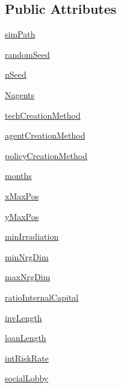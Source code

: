 \subsection*{Public Attributes}
\begin{DoxyCompactItemize}
\item 
\hyperlink{classenv_1_1environment_a5bdfe91b21e33187fc19732cb8a9b921}{sim\-Path}
\item 
\hyperlink{classenv_1_1environment_ae830fd3888199089f82966776e1f18c7}{random\-Seed}
\item 
\hyperlink{classenv_1_1environment_a4244ff6e2c8634df2516925372fd20b6}{n\-Seed}
\item 
\hyperlink{classenv_1_1environment_a59e53e7dea2fe8887ad57fc2d8401033}{Nagents}
\item 
\hyperlink{classenv_1_1environment_ad660202a7e9115467ba33e07b7a77410}{tech\-Creation\-Method}
\item 
\hyperlink{classenv_1_1environment_a9d3ca9f6128413b86d2dc36bdfeea2ff}{agent\-Creation\-Method}
\item 
\hyperlink{classenv_1_1environment_acd70b2f274af169cde96469312c2d15b}{policy\-Creation\-Method}
\item 
\hyperlink{classenv_1_1environment_ad476a5e1f3086610165842973d52e602}{months}
\item 
\hyperlink{classenv_1_1environment_a030668a5d974b79164862799ccddbff3}{x\-Max\-Pos}
\item 
\hyperlink{classenv_1_1environment_a1036c17b8afe9d1d7650bc781c9b7416}{y\-Max\-Pos}
\item 
\hyperlink{classenv_1_1environment_ad656812e1f4c4b1d904874b1852aa71d}{min\-Irradiation}
\item 
\hyperlink{classenv_1_1environment_ae6c208cb07e43fee86602e8c33cee097}{min\-Nrg\-Dim}
\item 
\hyperlink{classenv_1_1environment_ac66338a9395ca8bcf6b6258f26389f5d}{max\-Nrg\-Dim}
\item 
\hyperlink{classenv_1_1environment_a66246d7554c43ff1018b4cb033b6458d}{ratio\-Internal\-Capital}
\item 
\hyperlink{classenv_1_1environment_ad427d908e34d19a2b5b9a5f838df075c}{inv\-Length}
\item 
\hyperlink{classenv_1_1environment_a3c92d7cbf3a039cc851974f212250dd8}{loan\-Length}
\item 
\hyperlink{classenv_1_1environment_aa3b219d914da6b0d4f5dc916191f3d7f}{int\-Risk\-Rate}
\item 
\hyperlink{classenv_1_1environment_a07dabee911b3173d20d6d68edccbe31f}{social\-Lobby}

\end{DoxyCompactItemize}
